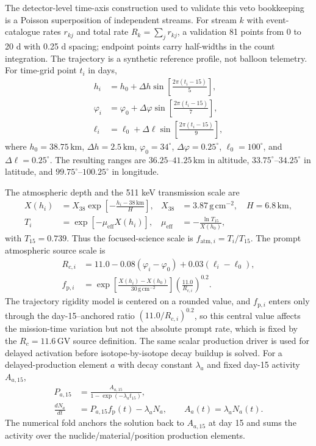 \documentclass[pdflatex,sn-mathphys-num]{sn-jnl}
\begin{document}
The detector-level time-axis construction used to validate this veto bookkeeping
is a Poisson superposition of independent streams. For stream $k$ with
event-catalogue rates $r_{kj}$ and total rate $R_k=\sum_j r_{kj}$, a validation
81 points from 0 to 20 d with 0.25 d spacing; endpoint points carry half-widths
in the count integration. The trajectory is a synthetic reference profile, not
balloon telemetry. For time-grid point $t_i$ in days,
\begin{align}
  h_i &= h_0+\Delta h\sin\!\left[\frac{2\pi(t_i-15)}{5}\right],\\
  \varphi_i &= \varphi_0+\Delta\varphi\sin\!\left[\frac{2\pi(t_i-15)}{7}\right],\\
  \ell_i &= \ell_0+\Delta\ell\sin\!\left[\frac{2\pi(t_i-15)}{9}\right],
\end{align}
where $h_0=38.75\,\mathrm{km}$, $\Delta h=2.5\,\mathrm{km}$,
$\varphi_0=34^\circ$, $\Delta\varphi=0.25^\circ$, $\ell_0=100^\circ$,
and $\Delta\ell=0.25^\circ$. The resulting ranges are
$36.25$--$41.25\,\mathrm{km}$ in altitude, $33.75^\circ$--$34.25^\circ$ in
latitude, and $99.75^\circ$--$100.25^\circ$ in longitude.

The atmospheric depth and the 511 keV transmission scale are
\begin{align}
  X(h_i) &= X_{38}\exp\!\left[-\frac{h_i-38\,\mathrm{km}}{H}\right],
       & X_{38}&=3.87\,\mathrm{g\,cm^{-2}},\quad H=6.8\,\mathrm{km},\\
  T_i &= \exp[-\mu_{\mathrm{eff}} X(h_i)],
       & \mu_{\mathrm{eff}}&=-\frac{\ln T_{15}}{X(h_0)},
\end{align}
with $T_{15}=0.739$. Thus the focused-science scale is
$f_{\mathrm{atm},i}=T_i/T_{15}$. The prompt atmospheric source scale is
\begin{align}
  R_{c,i} &= 11.0 -0.08(\varphi_i-\varphi_0)+0.03(\ell_i-\ell_0),\\
  f_{\mathrm{p},i} &=
  \exp\!\left[\frac{X(h_i)-X(h_0)}{30\,\mathrm{g\,cm^{-2}}}\right]
  \left(\frac{11.0}{R_{c,i}}\right)^{0.2}.
\end{align}
The trajectory rigidity model is centered on a rounded value, and $f_{\mathrm{p},i}$ enters only through the day-15--anchored ratio $(11.0/R_{c,i})^{0.2}$, so this central value affects the mission-time variation but not the absolute prompt rate, which is fixed by the $R_c=11.6\,\mathrm{GV}$ source definition. The same scalar production driver is used for delayed activation before
isotope-by-isotope decay buildup is solved. For a delayed-production element
$a$ with decay constant $\lambda_a$ and fixed day-15 activity $A_{a,15}$,
\begin{align}
  P_{a,15} &= \frac{A_{a,15}}{1-\exp(-\lambda_a t_{15})},\\
  \frac{dN_a}{dt} &= P_{a,15}f_{\mathrm{p}}(t)-\lambda_a N_a,\qquad
  A_a(t)=\lambda_a N_a(t).
\end{align}
The numerical fold anchors the solution back to $A_{a,15}$ at day 15 and sums
the activity over the nuclide/material/position production elements.
\end{document}
